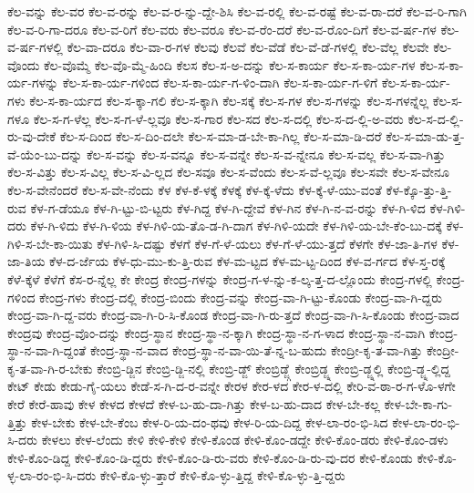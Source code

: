 {ಕೆಲ-ವನ್ನು
ಕೆಲ-ವರ
ಕೆಲ-ವ-ರನ್ನು
ಕೆಲ-ವ-ರ-ನ್ನು-ದ್ದೇ-ಶಿಸಿ
ಕೆಲ-ವ-ರಲ್ಲಿ
ಕೆಲ-ವ-ರಷ್ಟೆ
ಕೆಲ-ವ-ರಾ-ದರೆ
ಕೆಲ-ವ-ರಿ-ಗಾಗಿ
ಕೆಲ-ವ-ರಿ-ಗಾ-ದರೂ
ಕೆಲ-ವ-ರಿಗೆ
ಕೆಲ-ವರು
ಕೆಲ-ವರೂ
ಕೆಲ-ವ-ರೆಂ-ದರೆ
ಕೆಲ-ವ-ರೊಂ-ದಿಗೆ
ಕೆಲ-ವ-ರ್ಷ-ಗಳ
ಕೆಲ-ವ-ರ್ಷ-ಗಳಲ್ಲಿ
ಕೆಲ-ವಾ-ದರೂ
ಕೆಲ-ವಾ-ರ-ಗಳ
ಕೆಲವು
ಕೆಲವೆ
ಕೆಲ-ವೆಡೆ
ಕೆಲ-ವೆ-ಡೆ-ಗಳಲ್ಲಿ
ಕೆಲ-ವೆಲ್ಲ
ಕೆಲವೇ
ಕೆಲ-ವೊಂದು
ಕೆಲ-ವೊಮ್ಮೆ
ಕೆಲ-ವೊ-ಮ್ಮೆ-ಹಿಂದಿ
ಕೆಲಸ
ಕೆಲ-ಸ-ಅ-ದನ್ನು
ಕೆಲ-ಸ-ಕಾರ್ಯ
ಕೆಲ-ಸ-ಕಾ-ರ್ಯ-ಗಳ
ಕೆಲ-ಸ-ಕಾ-ರ್ಯ-ಗಳನ್ನು
ಕೆಲ-ಸ-ಕಾ-ರ್ಯ-ಗಳಿಂದ
ಕೆಲ-ಸ-ಕಾ-ರ್ಯ-ಗ-ಳಿಂ-ದಾಗಿ
ಕೆಲ-ಸ-ಕಾ-ರ್ಯ-ಗ-ಳಿಗೆ
ಕೆಲ-ಸ-ಕಾ-ರ್ಯ-ಗಳು
ಕೆಲ-ಸ-ಕಾ-ರ್ಯದ
ಕೆಲ-ಸ-ಕ್ಕಾ-ಗಲಿ
ಕೆಲ-ಸ-ಕ್ಕಾಗಿ
ಕೆಲ-ಸಕ್ಕೆ
ಕೆಲ-ಸ-ಗಳ
ಕೆಲ-ಸ-ಗಳನ್ನು
ಕೆಲ-ಸ-ಗಳನ್ನೆಲ್ಲ
ಕೆಲ-ಸ-ಗಳೂ
ಕೆಲ-ಸ-ಗ-ಳೆಲ್ಲ
ಕೆಲ-ಸ-ಗ-ಳೆ-ಲ್ಲವೂ
ಕೆಲ-ಸ-ಗಾರ
ಕೆಲ-ಸದ
ಕೆಲ-ಸ-ದಲ್ಲಿ
ಕೆಲ-ಸ-ದ-ಲ್ಲಿ-ಅ-ವರು
ಕೆಲ-ಸ-ದ-ಲ್ಲಿ-ರು-ವು-ದೇಕೆ
ಕೆಲ-ಸ-ದಿಂದ
ಕೆಲ-ಸ-ದಿಂ-ದಲೇ
ಕೆಲ-ಸ-ಮಾ-ಡ-ಬೇ-ಕಾ-ಗಿಲ್ಲ
ಕೆಲ-ಸ-ಮಾ-ಡಿ-ದರೆ
ಕೆಲ-ಸ-ಮಾ-ಡು-ತ್ತ-ವೆ-ಯೆಂ-ಬು-ದನ್ನು
ಕೆಲ-ಸ-ವನ್ನು
ಕೆಲ-ಸ-ವನ್ನೂ
ಕೆಲ-ಸ-ವನ್ನೇ
ಕೆಲ-ಸ-ವ-ನ್ನೇನೂ
ಕೆಲ-ಸ-ವಲ್ಲ
ಕೆಲ-ಸ-ವಾ-ಗಿತ್ತು
ಕೆಲ-ಸ-ವಿತ್ತು
ಕೆಲ-ಸ-ವಿಲ್ಲ
ಕೆಲ-ಸ-ವಿ-ಲ್ಲದ
ಕೆಲ-ಸವೂ
ಕೆಲ-ಸ-ವೆಂದು
ಕೆಲ-ಸ-ವೆ-ಲ್ಲವೂ
ಕೆಲ-ಸವೇ
ಕೆಲ-ಸ-ವೇನೂ
ಕೆಲ-ಸ-ವೇನೆಂದರೆ
ಕೆಲ-ಸ-ವೇ-ನೆಂದು
ಕೆಳ
ಕೆಳ-ಕೆ-ಳಕ್ಕೆ
ಕೆಳಕ್ಕೆ
ಕೆಳ-ಕ್ಕೆ-ಳೆದು
ಕೆಳ-ಕ್ಕೆ-ಳೆ-ಯು-ವಂತೆ
ಕೆಳ-ಕ್ಕೊ-ತ್ತು-ತ್ತಿ-ರುವ
ಕೆಳ-ಗ-ಡೆಯೂ
ಕೆಳ-ಗಿ-ಟ್ಟು-ಬಿ-ಟ್ಟರು
ಕೆಳ-ಗಿದ್ದ
ಕೆಳ-ಗಿ-ದ್ದೇವೆ
ಕೆಳ-ಗಿನ
ಕೆಳ-ಗಿ-ನ-ವ-ರನ್ನು
ಕೆಳ-ಗಿ-ಳಿದ
ಕೆಳ-ಗಿಳಿ-ದರು
ಕೆಳ-ಗಿ-ಳಿದು
ಕೆಳ-ಗಿ-ಳಿಯ
ಕೆಳ-ಗಿಳಿ-ಯ-ತೊ-ಡ-ಗಿ-ದಾಗ
ಕೆಳ-ಗಿಳಿ-ಯದೇ
ಕೆಳ-ಗಿಳಿ-ಯ-ಬೇ-ಕೆಂ-ಬು-ದಕ್ಕೆ
ಕೆಳ-ಗಿಳಿ-ಸ-ಬೇ-ಕಾ-ಯಿತು
ಕೆಳ-ಗಿಳಿ-ಸಿ-ದಷ್ಟು
ಕೆಳಗೆ
ಕೆಳ-ಗೆ-ಳೆ-ಯಲು
ಕೆಳ-ಗೆ-ಳೆ-ಯು-ತ್ತದೆ
ಕೆಳಗೇ
ಕೆಳ-ಜಾ-ತಿ-ಗಳ
ಕೆಳ-ಜಾ-ತಿಯ
ಕೆಳ-ದ-ರ್ಜೆಯ
ಕೆಳ-ಧು-ಮು-ಕು-ತ್ತಿ-ರುವ
ಕೆಳ-ಮ-ಟ್ಟದ
ಕೆಳ-ಮ-ಟ್ಟ-ದಿಂದ
ಕೆಳ-ವ-ರ್ಗದ
ಕೆಳ-ಸ್ತ-ರಕ್ಕೆ
ಕೆಳೆ-ಕ್ಕೆಳೆ
ಕೆಳೆಗೆ
ಕೆಸ-ರ-ನ್ನೆಲ್ಲ
ಕೇ
ಕೇಂದ್ರ
ಕೇಂದ್ರ-ಗಳನ್ನು
ಕೇಂದ್ರ-ಗ-ಳ-ನ್ನು-ಕ-ಲ್ಕ-ತ್ತ-ದ-ಲ್ಲೊಂದು
ಕೇಂದ್ರ-ಗಳಲ್ಲಿ
ಕೇಂದ್ರ-ಗಳಿಂದ
ಕೇಂದ್ರ-ಗಳು
ಕೇಂದ್ರ-ದಲ್ಲಿ
ಕೇಂದ್ರ-ಬಿಂದು
ಕೇಂದ್ರ-ವನ್ನು
ಕೇಂದ್ರ-ವಾ-ಗಿ-ಟ್ಟು-ಕೊಂಡು
ಕೇಂದ್ರ-ವಾ-ಗಿ-ದ್ದರು
ಕೇಂದ್ರ-ವಾ-ಗಿ-ದ್ದ-ವರು
ಕೇಂದ್ರ-ವಾ-ಗಿ-ರಿ-ಸಿ-ಕೊಂಡ
ಕೇಂದ್ರ-ವಾ-ಗಿ-ರು-ತ್ತದೆ
ಕೇಂದ್ರ-ವಾ-ಗಿ-ಸಿ-ಕೊಂಡು
ಕೇಂದ್ರ-ವಾದ
ಕೇಂದ್ರವು
ಕೇಂದ್ರ-ವೊಂ-ದನ್ನು
ಕೇಂದ್ರ-ಸ್ಥಾನ
ಕೇಂದ್ರ-ಸ್ಥಾ-ನ-ಕ್ಕಾಗಿ
ಕೇಂದ್ರ-ಸ್ಥಾ-ನ-ಗ-ಳಾದ
ಕೇಂದ್ರ-ಸ್ಥಾ-ನ-ವಾಗಿ
ಕೇಂದ್ರ-ಸ್ಥಾ-ನ-ವಾ-ಗಿ-ದ್ದಂತೆ
ಕೇಂದ್ರ-ಸ್ಥಾ-ನ-ವಾದ
ಕೇಂದ್ರ-ಸ್ಥಾ-ನ-ವಾ-ಯಿ-ತೆ-ನ್ನ-ಬ-ಹುದು
ಕೇಂದ್ರೀ-ಕೃ-ತ-ವಾ-ಗಿತ್ತು
ಕೇಂದ್ರೀ-ಕೃ-ತ-ವಾ-ಗಿ-ರ-ಬೇಕು
ಕೇಂಬ್ರಿ-ಡ್ಜಿನ
ಕೇಂಬ್ರಿ-ಡ್ಜಿ-ನಲ್ಲಿ
ಕೇಂಬ್ರಿ-ಡ್ಜ್
ಕೇಂಬ್ರಿಡ್ಜ್ಗೆ
ಕೇಂಬ್ರಿಡ್ಜ್ನ
ಕೇಂಬ್ರಿ-ಡ್ಜ್ನಲ್ಲಿ
ಕೇಂಬ್ರಿ-ಡ್ಜ್ನ-ಲ್ಲಿದ್ದ
ಕೇಟ್
ಕೇಡು
ಕೇಡು-ಗೈ-ಯಲು
ಕೇಡೆ-ಸ-ಗಿ-ದ-ರ-ವನ್ನೇ
ಕೇರಳ
ಕೇರ-ಳದ
ಕೇರ-ಳ-ದಲ್ಲಿ
ಕೇರಿ-ವ-ಠಾ-ರ-ಗ-ಳೊ-ಳಗೇ
ಕೇರೆ
ಕೇರೆ-ಹಾವು
ಕೇಳ
ಕೇಳದ
ಕೇಳದೆ
ಕೇಳ-ಬ-ಹು-ದಾ-ಗಿತ್ತು
ಕೇಳ-ಬ-ಹು-ದಾದ
ಕೇಳ-ಬೇ-ಕಲ್ಲ
ಕೇಳ-ಬೇ-ಕಾ-ಗು-ತ್ತಿತ್ತು
ಕೇಳ-ಬೇಕು
ಕೇಳ-ಬೇ-ಕೆಂಬ
ಕೇಳ-ರಿ-ಯ-ದಂ-ಥವು
ಕೇಳ-ರಿ-ಯ-ದಿದ್ದ
ಕೇಳ-ಲಾ-ರಂ-ಭಿ-ಸಿದ
ಕೇಳ-ಲಾ-ರಂ-ಭಿ-ಸಿ-ದರು
ಕೇಳಲು
ಕೇಳ-ಲೆಂದು
ಕೇಳಿ
ಕೇಳಿ-ಕೇಳಿ
ಕೇಳಿ-ಕೊಂಡ
ಕೇಳಿ-ಕೊಂ-ಡದ್ದೇ
ಕೇಳಿ-ಕೊಂ-ಡರು
ಕೇಳಿ-ಕೊಂ-ಡಳು
ಕೇಳಿ-ಕೊಂ-ಡಿದ್ದ
ಕೇಳಿ-ಕೊಂ-ಡಿ-ದ್ದರು
ಕೇಳಿ-ಕೊಂ-ಡಿ-ರು-ವರು
ಕೇಳಿ-ಕೊಂ-ಡಿ-ರು-ವು-ದರ
ಕೇಳಿ-ಕೊಂಡು
ಕೇಳಿ-ಕೊ-ಳ್ಳ-ಲಾ-ರಂ-ಭಿ-ಸಿ-ದರು
ಕೇಳಿ-ಕೊ-ಳ್ಳು-ತ್ತಾರೆ
ಕೇಳಿ-ಕೊ-ಳ್ಳು-ತ್ತಿದ್ದ
ಕೇಳಿ-ಕೊ-ಳ್ಳು-ತ್ತಿ-ದ್ದರು
}
